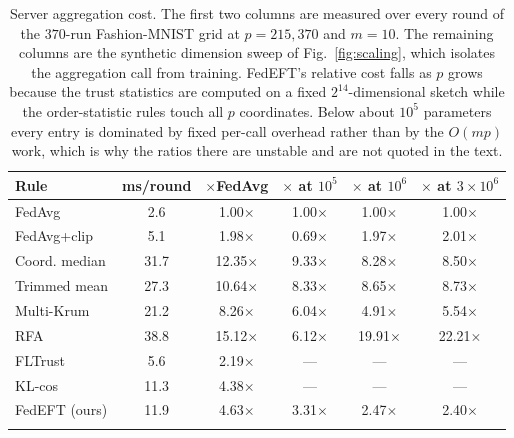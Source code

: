 \begin{table}[t]
\centering
\caption{Server aggregation cost. The first two columns are measured over every round of the $370$-run Fashion-MNIST grid at $p=215{,}370$ and $m=10$. The remaining columns are the synthetic dimension sweep of Fig.~\ref{fig:scaling}, which isolates the aggregation call from training. FedEFT's relative cost falls as $p$ grows because the trust statistics are computed on a fixed $2^{14}$-dimensional sketch while the order-statistic rules touch all $p$ coordinates. Below about $10^{5}$ parameters every entry is dominated by fixed per-call overhead rather than by the $O(mp)$ work, which is why the ratios there are unstable and are not quoted in the text.}
\label{tab:cost}
\setlength{\tabcolsep}{4.5pt}
\footnotesize
\begin{tabular}{@{}lccccc@{}}
\toprule
Rule & ms/round & $\times$FedAvg & $\times$ at $10^{5}$ & $\times$ at $10^{6}$ & $\times$ at $3\!\times\!10^{6}$\\
\midrule
FedAvg & 2.6 & 1.00$\times$ & 1.00$\times$ & 1.00$\times$ & 1.00$\times$\\
FedAvg+clip & 5.1 & 1.98$\times$ & 0.69$\times$ & 1.97$\times$ & 2.01$\times$\\
Coord. median & 31.7 & 12.35$\times$ & 9.33$\times$ & 8.28$\times$ & 8.50$\times$\\
Trimmed mean & 27.3 & 10.64$\times$ & 8.33$\times$ & 8.65$\times$ & 8.73$\times$\\
Multi-Krum & 21.2 & 8.26$\times$ & 6.04$\times$ & 4.91$\times$ & 5.54$\times$\\
RFA & 38.8 & 15.12$\times$ & 6.12$\times$ & 19.91$\times$ & 22.21$\times$\\
FLTrust & 5.6 & 2.19$\times$ & --- & --- & ---\\
KL-cos & 11.3 & 4.38$\times$ & --- & --- & ---\\
\midrule
FedEFT (ours) & 11.9 & 4.63$\times$ & 3.31$\times$ & 2.47$\times$ & 2.40$\times$\\
\botrule
\end{tabular}
\end{table}
